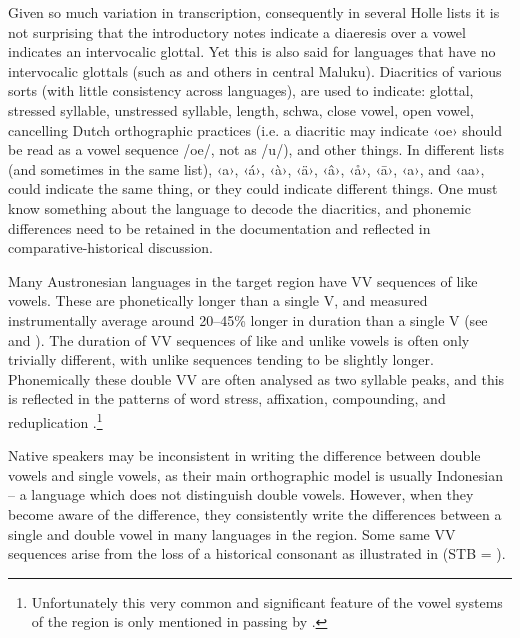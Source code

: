 Given so much variation in transcription,
consequently in several Holle lists it is not surprising that
the introductory notes indicate a diaeresis over a vowel
indicates an intervocalic glottal.
Yet this is also said for languages that have no intervocalic
glottals (such as 
and others in central Maluku).
Diacritics of various sorts (with little consistency across languages),
are used to indicate: glottal,
stressed syllable, unstressed syllable,
length, schwa, close vowel, open vowel,
cancelling Dutch orthographic practices (i.e.
a diacritic may indicate ‹oe› should be read as a vowel
sequence /oe/, not as /u/), and other things.
In different lists (and sometimes in the same list),
‹a›, ‹á›, ‹à›, ‹ä›,
‹â›, ‹å›, ‹ā›, ‹a›, and ‹aa›,
could indicate the same thing,
or they could indicate different things.
One must know something about the language to decode the diacritics,
and phonemic differences need to be retained in the documentation
and reflected in comparative-historical discussion.

Many Austronesian languages in the target region have VV sequences of like vowels.
These are phonetically longer than a single V,
and measured instrumentally average around 20--45{\%} longer
in duration than a single V
(see \citealp[95--99]{Edwards2020}
and \citealp{Grimes2024}).
The duration of VV sequences of like
and unlike vowels is often only trivially different,
with unlike sequences tending to be slightly longer.
Phonemically these double VV are often analysed as two syllable
peaks, and this is reflected in the patterns of word stress,
affixation, compounding, and reduplication \citep{CulhaneEdwards2021}.\footnote{
		Unfortunately this very common
		and significant feature of the vowel systems of the region is
		only mentioned in passing by \citet{Hajek2010}.}

Native speakers may be inconsistent in writing the difference
between double vowels and single vowels, as their main orthographic model is usually
Indonesian -- a language which does not distinguish double vowels.
However, when they become aware of the difference,
they consistently write the differences between a single
and double vowel in many languages in the region.
Some same VV sequences arise from the loss of a historical
consonant as illustrated in 
(STB = ).

